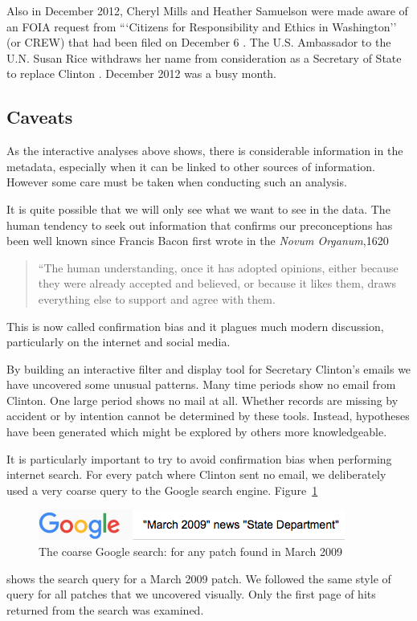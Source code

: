 \documentclass[journal]{vgtc}                %
\begin{document}
Also in December 2012, Cheryl Mills and Heather Samuelson were made aware of an FOIA request from ```Citizens for Responsibility and Ethics in Washington'' (or CREW) that had been filed on December 6 \cite{CREWFOIA, FOIAcall}.   The U.S. Ambassador to the U.N. Susan Rice withdraws her name from consideration as a Secretary of State to replace Clinton \cite{RiceWithdraws}.  December 2012 was a busy month.

\subsection{Caveats}
\label{sect:caveats}
As the interactive analyses above shows, there is considerable information in the metadata, especially when it can be linked to other sources of information.  However some care must be taken when conducting such an analysis.  

It is quite possible that we will only see what we want to see in the data.  The human tendency to seek out information that confirms our preconceptions has been well known since Francis Bacon first wrote in the \emph{Novum Organum},1620
\begin{quotation}
``The human understanding, once it has adopted opinions, either because they were already accepted and believed, or because it likes them, draws everything else to support and agree with them.
\end{quotation}
This is now called confirmation bias \cite{confBias} and it plagues much modern discussion, particularly on the internet and social media.  

By building an interactive filter and display tool for Secretary Clinton's emails we have uncovered some unusual patterns.  Many time periods show no email from Clinton.  One large period shows no mail at all.  Whether records are missing by accident or by intention cannot be determined by these tools. 
Instead, hypotheses have been generated which might be explored by others more knowledgeable.

It is particularly important to try to avoid confirmation bias when performing internet search.  For every patch where Clinton sent no email, we deliberately used a very coarse query to the Google search engine.   
Figure~\ref{fig:googleSearch}
\begin{figure}[h]
\begin{center}
\includegraphics[width=0.75\linewidth]{googleSearch}
\caption{The coarse Google search: for any patch found in March 2009}
\label{fig:googleSearch}
\end{center}
\end{figure}
shows the search query for a March 2009 patch.  We followed the same style of query for all patches that we uncovered visually.  Only the first page of hits returned from the search was examined.
\end{document}

